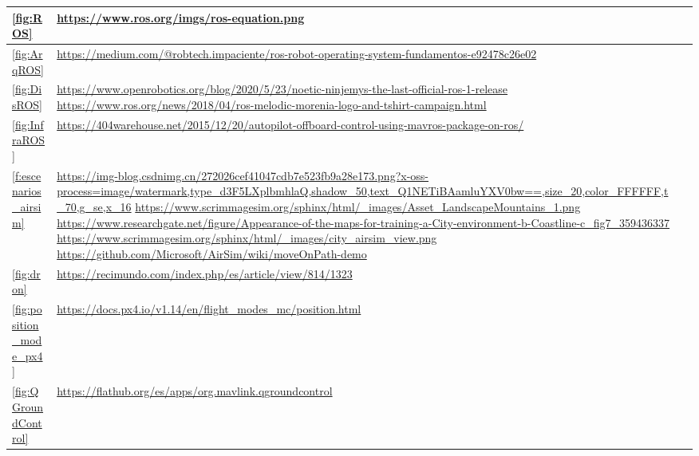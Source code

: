 \begin{tabular}{ | m{4cm} | m{10cm}| m{1cm} | }

    \hline
    \ref{fig:ROS} & \url{https://www.ros.org/imgs/ros-equation.png} \\
    \hline
    \ref{fig:ArqROS} & \url{https://medium.com/@robtech.impaciente/ros-robot-operating-system-fundamentos-e92478c26e02} \\
    \hline
    \ref{fig:DisROS} & \url{https://www.openrobotics.org/blog/2020/5/23/noetic-ninjemys-the-last-official-ros-1-release} \newline
    \url{https://www.ros.org/news/2018/04/ros-melodic-morenia-logo-and-tshirt-campaign.html}\\
    \hline
    \ref{fig:InfraROS} & \url{https://404warehouse.net/2015/12/20/autopilot-offboard-control-using-mavros-package-on-ros/} \\
    \hline
    \ref{f:escenarios_airsim} & \url{https://img-blog.csdnimg.cn/272026cef41047cdb7e523fb9a28e173.png?x-oss-process=image/watermark,type_d3F5LXplbmhlaQ,shadow_50,text_Q1NETiBAamluYXV0bw==,size_20,color_FFFFFF,t_70,g_se,x_16} \newline
    \url{https://www.scrimmagesim.org/sphinx/html/_images/Asset_LandscapeMountains_1.png} \newline
    \url{https://www.researchgate.net/figure/Appearance-of-the-maps-for-training-a-City-environment-b-Coastline-c_fig7_359436337} \newline
    \url{https://www.scrimmagesim.org/sphinx/html/_images/city_airsim_view.png} \newline
    \url{https://github.com/Microsoft/AirSim/wiki/moveOnPath-demo} \\
    \hline
    \ref{fig:dron} & \url{https://recimundo.com/index.php/es/article/view/814/1323} \\
    \hline
    \ref{fig:position_mode_px4} & \url{https://docs.px4.io/v1.14/en/flight_modes_mc/position.html} \\
    \hline
    \ref{fig:QGroundControl} & \url{https://flathub.org/es/apps/org.mavlink.qgroundcontrol} \\
    \hline

\end{tabular}




